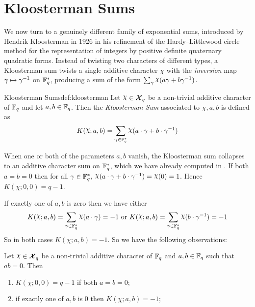 \section{Kloosterman Sums}\label{sec:kloosterman}
We now turn to a genuinely different family of exponential sums, introduced by Hendrik Kloosterman in 1926 in his refinement of the Hardy--Littlewood circle method for the representation of integers by positive definite quaternary quadratic forms. Instead of twisting two characters of different types, a Kloosterman sum twists a single additive character $\chi$ with the \emph{inversion} map $\gamma\mapsto \gamma^{-1}$ on $\mathbb{F}_q^*$, producing a sum of the form $\sum_{\gm}\chi(a\gm+b\gm^{-1})$.

\begin{Definition}{Kloosterman Sums}{def:kloosterman}
  Let $\chi\in\Xq$ be a non-trivial additive character of $\mathbb{F}_q$ and let $a,b\in\mathbb{F}_q$. Then the \emph{Kloosterman Sum} associated to $\chi,a,b$ is defined as $$K(\chi;a,b)=\sum_{\gm\in\bbF_q^*}\chi(a\cdot \gm+b\cdot \gm^{-1})$$
\end{Definition}

When one or both of the parameters $a,b$ vanish, the Kloosterman sum collapses to an additive character sum on $\mathbb{F}_q^*$, which we have already computed in \AddCharPropsthm. If both $a=b=0$ then for all $\gamma\in\mathbb{F}_q^*$, $\chi(a\cdot \gm+b\cdot \gm^{-1})=\chi(0)=1$. Hence $K(\chi;0,0)=q-1$. 

If exactly one of $a,b$ is zero then we have either $$K(\chi;a,b)=\sum_{\gm\in\bbF_q^*}\chi(a\cdot \gm)=-1\text{ or }K(\chi;a,b)=\sum_{\gm\in\bbF_q^*}\chi(b\cdot \gm^{-1})=-1$$ So in both cases $K(\chi;a,b)=-1$. So we have the following observations:
\begin{observation}\label{obs:kloosterman-at-zero}
  Let $\chi\in\Xq$ be a non-trivial additive character of $\mathbb{F}_q$ and $a,b\in\mathbb{F}_q$ such that $ab=0$. Then
  \begin{enumerate}[label=(\roman*)]
    \item $K(\chi;0,0)=q-1$ if both $a=b=0$;
    \item if exactly one of $a,b$ is $0$ then $K(\chi;a,b)=-1$;
  \end{enumerate}
\end{observation}

